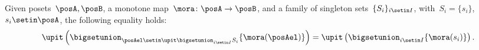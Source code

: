 \begin{lemma}
    \label{lem:unpack_u_functor}
    Given posets~$\posA,\posB$, a monotone map~$\mora \colon \posA \to \posB$, and a family of singleton sets~$\{S_i\}_{i\setin I}$, with~$S_i=\{s_i\}$,~$s_i\setin \posA$, the following equality holds:
    \begin{equation}
        \label{eq:lemma_unpack}
        \upit \left( \bigsetunion_{\posAel \setin \upit \bigsetunion_{i\setin I}S_i}\{\mora(\posAel)\}\right)= \upit \left( \bigsetunion_{i\setin I} \{\mora(s_i)\}\right).
    \end{equation}
\end{lemma}


